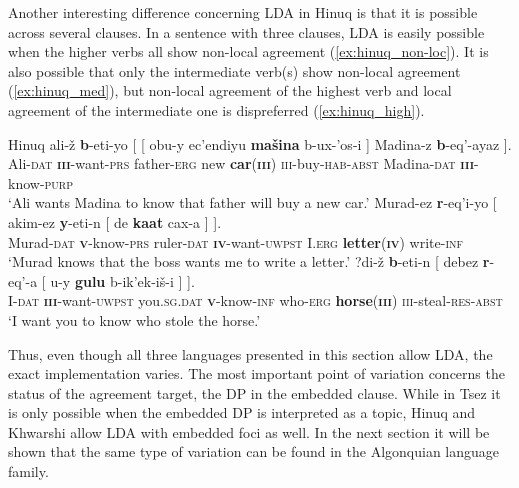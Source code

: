 \documentclass[output=paper
,modfonts
,nonflat]{langsci/langscibook}
\begin{document}
Another interesting difference concerning LDA in Hinuq is that it is possible across several clauses. In a sentence with three clauses, LDA is easily possible when the higher verbs all show non-local agreement (\ref{ex:hinuq_non-loc}). It is also possible that only the intermediate verb(s) show non-local agreement (\ref{ex:hinuq_med}), but non-local agreement of the highest verb and local agreement of the intermediate one is dispreferred (\ref{ex:hinuq_high}).
\begin{exe}
\ex Hinuq \citep[][633]{Forker2012} \label{ex:hinuq_cross-clausal}
	\xlist
	\ex \label{ex:hinuq_non-loc}
		\gll \textipa{\textbarglotstop}ali-\v{z} \textbf{b}-eti-yo [ [ obu-y ec'endiyu \textbf{ma\v{s}ina} b-ux-'os-\textipa{\textbeltl}i ] Madina-z \textbf{b}-eq'-ayaz ].\\
			 Ali-\textsc{dat} \textbf{\textsc{iii}}-want-\textsc{prs} {} {} father-\textsc{erg} new \textbf{car}(\textbf{\textsc{iii}}) \textsc{iii}-buy-\textsc{hab}-\textsc{abst} {} Madina-\textsc{dat} \textbf{\textsc{iii}}-know-\textsc{purp}\\
		\glt `Ali wants Madina to know that father will buy a new car.'
	\ex \label{ex:hinuq_med}
		\gll Murad-ez \textbf{r}-eq'i-yo [ \textipa{\textcrh}akim-ez \textbf{y}-eti-n [ de \textbf{kaat} cax-a ] ].\\
			 Murad-\textsc{dat} \textbf{\textsc{v}}-know-\textsc{prs} {} ruler-\textsc{dat} \textbf{\textsc{iv}}-want-\textsc{uwpst} {} I.\textsc{erg} \textbf{letter}(\textbf{\textsc{iv}}) write-\textsc{inf}\\
		\glt `Murad knows that the boss wants me to write a letter.'
	\ex \label{ex:hinuq_high}
		\gll ?di-\v{z} \textbf{b}-eti-n [ debez \textbf{r}-eq'-a [ \textipa{\textbeltl}u-y \textbf{gulu} b-ik'ek-i\v{s}-\textipa{\textbeltl}i ] ].\\
			 I-\textsc{dat} \textbf{\textsc{iii}}-want-\textsc{uwpst} {} you.\textsc{sg.dat} \textbf{\textsc{v}}-know-\textsc{inf} {} who-\textsc{erg} \textbf{horse}(\textbf{\textsc{iii}}) \textsc{iii}-steal-\textsc{res}-\textsc{abst}\\
		\glt `I want you to know who stole the horse.'
	\endxlist
\end{exe}
Thus, even though all three languages presented in this section allow LDA, the exact implementation varies. The most important point of variation concerns the status of the agreement target, the DP in the embedded clause. While in Tsez it is only possible when the embedded DP is interpreted as a topic, Hinuq and Khwarshi allow LDA with embedded foci as well. In the next section it will be shown that the same type of variation can be found in the Algonquian language family.
\end{document}
